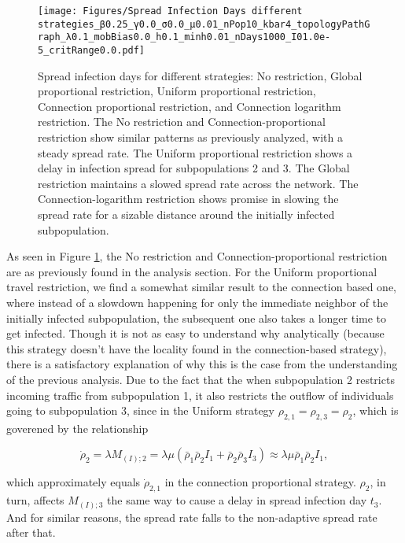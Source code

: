 \begin{figure}
    \texttt{[image: Figures/Spread Infection Days different strategies\_β0.25\_γ0.0\_σ0.0\_μ0.01\_nPop10\_kbar4\_topologyPathGraph\_λ0.1\_mobBias0.0\_h0.1\_minh0.01\_nDays1000\_I01.0e-5\_critRange0.0.pdf]}
    \caption{Spread infection days for different strategies: No restriction, Global proportional restriction, Uniform proportional restriction, Connection proportional restriction, and Connection logarithm restriction. The No restriction and Connection-proportional restriction show similar patterns as previously analyzed, with a steady spread rate. The Uniform proportional restriction shows a delay in infection spread for subpopulations 2 and 3. The Global restriction maintains a slowed spread rate across the network. The Connection-logarithm restriction shows promise in slowing the spread rate for a sizable distance around the initially infected subpopulation.}
    \label{fig:spread-day-strategies}
\end{figure}

As seen in Figure \ref{fig:spread-day-strategies}, the No restriction and Connection-proportional restriction are as previously found in the analysis section. For the Uniform proportional travel restriction, we find a somewhat similar result to the connection based one, where instead of a slowdown happening for only the immediate neighbor of the initially infected subpopulation, the subsequent one also takes a longer time to get infected. Though it is not as easy to understand why analytically (because this strategy doesn't have the locality found in the connection-based strategy), there is a satisfactory explanation of why this is the case from the understanding of the previous analysis. Due to the fact that the when subpopulation 2 restricts incoming traffic from subpopulation 1, it also restricts the outflow of individuals going to subpopulation 3, since in the Uniform strategy $\rho_{2,1}=\rho_{2,3}=\rho_2$, which is goverened by the relationship

$$
	\dot{\rho}_2=\lambda M_{(I);2}= \lambda \mu (\bar{\rho}_{1} \bar{\rho}_{2} I_1 + \bar{\rho}_{2} \bar{\rho}_{3} I_3) \approx \lambda \mu \bar{\rho}_{1} \bar{\rho}_{2} I_1,
$$

which approximately equals $\dot{\rho}_{2,1}$ in the connection proportional strategy. $\rho_2$, in turn, affects $M_{(I);3}$ the same way to cause a delay in spread infection day $t_3$. And for similar reasons, the spread rate falls to the non-adaptive spread rate after that.\\

